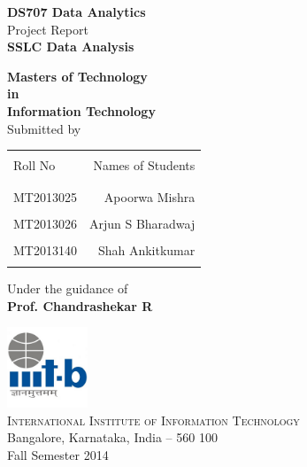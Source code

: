 \begin{titlepage}

\begin{center}

\textup{\small {\bf DS707 Data Analytics} \\ Project Report}\\[0.2in]

\Large \textbf {SSLC Data Analysis}\\[0.5in]       
        \vspace{.2in}

       {\bf Masters of Technology \\in\\ Information Technology}\\[0.5in]

\normalsize Submitted by \\
\begin{table}[h]
\centering
\begin{tabular}{lr}\hline \\
Roll No & Names of Students \\ \\ \hline
\\
MT2013025 & Apoorwa Mishra \\ \\
MT2013026 & Arjun S Bharadwaj \\ \\
MT2013140 & Shah Ankitkumar \\ \\ \hline 
\end{tabular}
\end{table}

\vspace{.1in}
Under the guidance of\\
{\textbf{Prof. Chandrashekar R}}\\[0.2in]

\vfill

\includegraphics[width=0.18\textwidth]{./iiitb-logo}\\[0.1in]
\normalsize
\textsc{International Institute of Information Technology}\\
Bangalore, Karnataka, India -- 560 100 \\
\vspace{0.2cm}
Fall Semester 2014

\end{center}

\end{titlepage}

